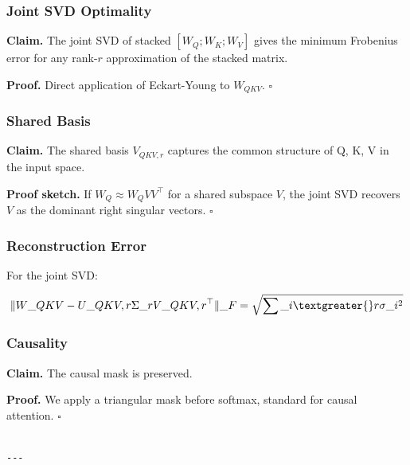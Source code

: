 \subsubsection{Joint SVD Optimality}

\textbf{Claim.} The joint SVD of stacked $[W_Q; W_K; W_V]$ gives the minimum 
Frobenius error for any rank-$r$ approximation of the stacked matrix.

\textbf{Proof.} Direct application of Eckart-Young to $W_{QKV}$. $\square$

\subsubsection{Shared Basis}

\textbf{Claim.} The shared basis $V_{QKV, r}$ captures the common structure of Q, 
K, V in the input space.

\textbf{Proof sketch.} If $W_Q \approx W_Q V V^\top$ for a shared subspace $V$, the 
joint SVD recovers $V$ as the dominant right singular vectors. $\square$

\subsubsection{Reconstruction Error}

For the joint SVD:

\[
\|W\_{QKV} - U\_{QKV, r} \Sigma\_r V\_{QKV, r}^\top\|\_F = \sqrt{\sum\_{i \textgreater{} r} \sigma\_i^2}
\]

\subsubsection{Causality}

\textbf{Claim.} The causal mask is preserved.

\textbf{Proof.} We apply a triangular mask before softmax, standard for causal 
attention. $\square$
\begin{lstlisting}

---
\end{lstlisting}
